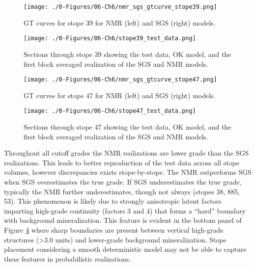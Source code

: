 \begin{figure}[htb!]
    \centering
    \texttt{[image: ./0-Figures/06-Ch6/nmr\_sgs\_gtcurve\_stope39.png]}
    \caption{\Gls{GT} curves for stope 39 for \gls{NMR} (left) and \gls{SGS} (right) models. }
    \label{fig:nmr_sgs_gtcurve_stope39}
\end{figure}

\begin{figure}[htb!]
    \centering
    \texttt{[image: ./0-Figures/06-Ch6/stope39\_test\_data.png]}
    \caption{Sections through stope 39 showing the test data, \gls{OK} model, and the first block averaged realization of the \gls{SGS} and \gls{NMR} models.}
    \label{fig:stope39_test_data}
\end{figure}

\begin{figure}[htb!]
    \centering
    \texttt{[image: ./0-Figures/06-Ch6/nmr\_sgs\_gtcurve\_stope47.png]}
    \caption{\Gls{GT} curves for stope 47 for \gls{NMR} (left) and \gls{SGS} (right) models. }
    \label{fig:nmr_sgs_gtcurve_stope47}
\end{figure}

\begin{figure}[htb!]
    \centering
    \texttt{[image: ./0-Figures/06-Ch6/stope47\_test\_data.png]}
    \caption{Sections through stope 47 showing the test data, \gls{OK} model, and the first block averaged realization of the \gls{SGS} and \gls{NMR} models.}
    \label{fig:stope47_test_data}
\end{figure}

Throughout all cutoff grades the \gls{NMR} realizations are lower grade than the \gls{SGS} realizations. This leads to better reproduction of the test data across all stope volumes, however discrepancies exists stope-by-stope. The \gls{NMR} outperforms \gls{SGS} when \gls{SGS} overestimates the true grade. If \gls{SGS} underestimates the true grade, typically the \gls{NMR} further underestimates, though not always (stopes 38, 885, 53). This phenomenon is likely due to strongly anisotropic latent factors imparting high-grade continuity (factors 3 and 4) that forms a ``hard'' boundary with background mineralization. This feature is evident in the bottom panel of Figure \ref{fig:stope47_test_data} where sharp boundaries are present between vertical high-grade structures (>3.0 units) and lower-grade background mineralization. Stope placement considering a smooth deterministic model may not be able to capture these features in probabilistic realizations.

